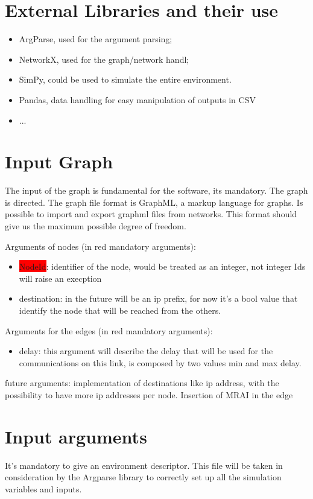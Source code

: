 \documentclass[10pt,conference,letterpaper]{IEEEtran}
\begin{document}
\section{External Libraries and their use}
\label{sec:extLib}

\begin{itemize}
		\item ArgParse, used for the argument parsing;
		\item NetworkX, used for the graph/network handl;
		\item SimPy, could be used to simulate the entire environment.
		\item Pandas, data handling for easy manipulation of outputs in CSV
		\item ...
\end{itemize}

\section{Input Graph}
\label{sec:graph}
The input of the graph is fundamental for the software, its mandatory.
The graph is directed.
The graph file format is GraphML, a markup language for graphs.
Is possible to import and export graphml files from networks.
This format should give us the maximum possible degree of freedom.

Arguments of nodes (in red mandatory arguments):
\begin{itemize}
		\item \colorbox{red}{NodeId}: identifier of the node, would be treated
			as an integer, not integer Ids will raise an execption
		\item destination: in the future will be an ip prefix, for now it's a
			bool value that identify the node that will be reached from the 
			others.
\end{itemize}

Arguments for the edges (in red mandatory arguments):
\begin{itemize}
		\item delay: this argument will describe the delay that will be used
			for the communications on this link, is composed by two values
			min and max delay.
\end{itemize}

future arguments:
implementation of destinations like ip address, with the possibility to have
more ip addresses per node.
Insertion of \ac{MRAI} in the edge

\section{Input arguments}
\label{sec:envDesc}
It's mandatory to give an environment descriptor.
This file will be taken in consideration by the Argparse library to correctly
set up all the simulation variables and inputs.
\end{document}
